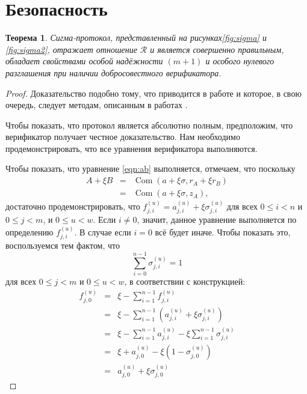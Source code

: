 \documentclass{article}
\newcommand{\com}{\operatorname{Com}}
\newcommand{\sumi}{\sum_{i=0}^{n-1}}
\newtheorem{theorem}{Теорема}
\theoremstyle{definition}
\begin{document}
\section{Безопасность}
\begin{theorem}
Сигма-протокол, представленный на рисунках\ref{fig:sigma} и \ref{fig:sigma2}, отражает отношение $\mathcal{R}$ и является совершенно правильным, обладает свойствами особой надёжности $(m+1)$ и особого нулевого разглашения при наличии добросовестного верификатора.
\end{theorem}

\begin{proof}
Доказательство подобно тому, что приводится в работе \cite{triptych} и которое, в свою очередь, следует методам, описанным в работах \cite{groth,bootle}.

Чтобы показать, что протокол является абсолютно полным, предположим, что верификатор получает честное доказательство. Нам необходимо продемонстрировать, что все уравнения верификатора выполняются.

Чтобы показать, что уравнение \ref{eqn:ab} выполняется, отмечаем, что поскольку
\begin{eqnarray*}
A + \xi B &=& \com(a + \xi\sigma,r_A + \xi r_B) \\
&=& \com(a + \xi\sigma,z_A),
\end{eqnarray*}
достаточно продемонстрировать, что $f_{j,i}^{(u)} = a_{j,i}^{(u)} + \xi\sigma_{j,i}^{(u)}$ для всех $0 \leq i < n$ и $0 \leq j < m$, и $0 \leq u < w$.
Если $i \neq 0$, значит, данное уравнение выполняется по определению $f_{j,i}^{(u)}$.
В случае если $i = 0$ всё будет иначе.
Чтобы показать это, воспользуемся тем фактом, что $$\sumi \sigma_{j,i}^{(u)} = 1$$ для всех $0 \leq j < m$ и $0 \leq u < w$, в соответствии с конструкцией:
\begin{eqnarray*}
f_{j,0}^{(u)} &=& \xi - \sum_{i=1}^{n-1} f_{j,i}^{(u)} \\
&=& \xi - \sum_{i=1}^{n-1} \left( a_{j,i}^{(u)} + \xi\sigma_{j,i}^{(u)} \right) \\
&=& \xi - \sum_{i=1}^{n-1} a_{j,i}^{(u)} - \xi\sum_{i=1}^{n-1} \sigma_{j,i}^{(u)} \\
&=& \xi + a_{j,0}^{(u)} - \xi\left( 1 - \sigma_{j,0}^{(u)} \right) \\
&=& a_{j,0}^{(u)} + \xi\sigma_{j,0}^{(u)}
\end{eqnarray*}


\end{proof}
\end{document}
